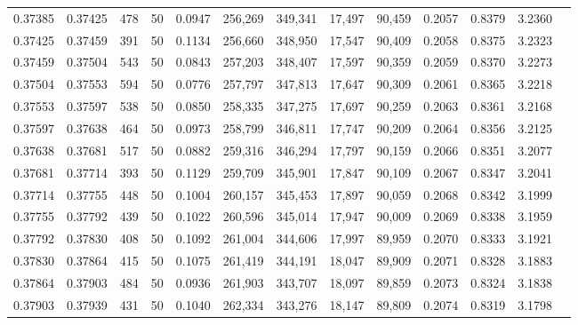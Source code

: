 \begin{tabular}{rrrrrrrrrrrrr}
0.37385 & 0.37425 &   478 &  50 &                                     0.0947 & 256,269 & 349,341 &  17,497 &  90,459 & 0.2057 & 0.8379 & 3.2360 \\
0.37425 & 0.37459 &   391 &  50 &                                     0.1134 & 256,660 & 348,950 &  17,547 &  90,409 & 0.2058 & 0.8375 & 3.2323 \\
0.37459 & 0.37504 &   543 &  50 &                                     0.0843 & 257,203 & 348,407 &  17,597 &  90,359 & 0.2059 & 0.8370 & 3.2273 \\
0.37504 & 0.37553 &   594 &  50 &                                     0.0776 & 257,797 & 347,813 &  17,647 &  90,309 & 0.2061 & 0.8365 & 3.2218 \\
0.37553 & 0.37597 &   538 &  50 &                                     0.0850 & 258,335 & 347,275 &  17,697 &  90,259 & 0.2063 & 0.8361 & 3.2168 \\
0.37597 & 0.37638 &   464 &  50 &                                     0.0973 & 258,799 & 346,811 &  17,747 &  90,209 & 0.2064 & 0.8356 & 3.2125 \\
0.37638 & 0.37681 &   517 &  50 &                                     0.0882 & 259,316 & 346,294 &  17,797 &  90,159 & 0.2066 & 0.8351 & 3.2077 \\
0.37681 & 0.37714 &   393 &  50 &                                     0.1129 & 259,709 & 345,901 &  17,847 &  90,109 & 0.2067 & 0.8347 & 3.2041 \\
0.37714 & 0.37755 &   448 &  50 &                                     0.1004 & 260,157 & 345,453 &  17,897 &  90,059 & 0.2068 & 0.8342 & 3.1999 \\
0.37755 & 0.37792 &   439 &  50 &                                     0.1022 & 260,596 & 345,014 &  17,947 &  90,009 & 0.2069 & 0.8338 & 3.1959 \\
0.37792 & 0.37830 &   408 &  50 &                                     0.1092 & 261,004 & 344,606 &  17,997 &  89,959 & 0.2070 & 0.8333 & 3.1921 \\
0.37830 & 0.37864 &   415 &  50 &                                     0.1075 & 261,419 & 344,191 &  18,047 &  89,909 & 0.2071 & 0.8328 & 3.1883 \\
0.37864 & 0.37903 &   484 &  50 &                                     0.0936 & 261,903 & 343,707 &  18,097 &  89,859 & 0.2073 & 0.8324 & 3.1838 \\
0.37903 & 0.37939 &   431 &  50 &                                     0.1040 & 262,334 & 343,276 &  18,147 &  89,809 & 0.2074 & 0.8319 & 3.1798 \\

\end{tabular}
